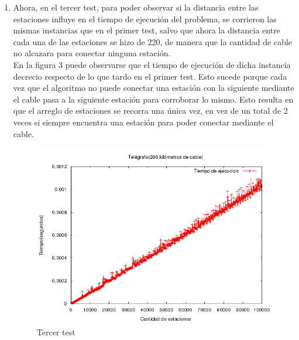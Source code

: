 \documentclass[10pt, a4paper]{article}
\begin{document}
\begin{enumerate}
	\item Ahora, en el tercer test, para poder observar si la distancia entre las estaciones influye en el tiempo de ejecuci\'on del problema, se corrieron las mismas instancias que en el primer test, salvo que ahora la distancia entre cada una de las estaciones se hizo de 220, de manera que la cantidad de cable no alcazara para conectar ninguna estaci\'on.\\
	En la figura 3 puede observarse que el tiempo de ejecuci\'on de dicha instancia decrecio respecto de lo que tardo en el primer test. Esto sucede porque cada vez que el algoritmo no puede conectar una estaci\'on con la siguiente mediante el cable pasa a la siguiente estaci\'on para corroborar lo mismo. Esto resulta en que el arreglo de estaciones se recorra una \'unica vez, en vez de un total de 2 veces si siempre encuentra una estaci\'on para poder conectar mediante el cable.\\
	\begin{figure}[H]
  		\centering
   	 	\includegraphics[width=1\textwidth]
   	 	{Imagenes/telegrafoTiempos6.png}
		\caption{Tercer test}
	\end{figure}
	

\end{enumerate}
\end{document}
